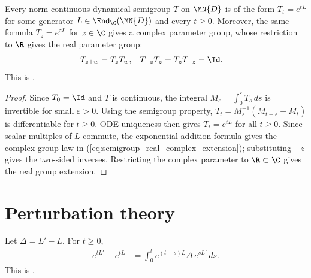 \begin{theorem}
    \label{thm:continuousDynSemigroup_eq_exp_ch12}
    \leanok
    Every norm-continuous dynamical semigroup $T$ on $\MN{D}$ is
    of the form $T_t = e^{tL}$ for some generator
    $L \in \End_{\C}(\MN{D})$ and every $t \ge 0$.
    Moreover, the same formula $T_z=e^{zL}$ for $z\in\C$ gives a complex
    parameter group, whose restriction to $\R$ gives the real parameter group:
    \begin{align}
        T_{z+w}&=T_zT_w,
        &T_{-z}T_z=T_zT_{-z}&=\Id.
        \label{eq:semigroup_real_complex_extension}
    \end{align}
    This is \cite[Proposition~7.1]{Wolf2012Quantum}.
\end{theorem}

\begin{proof}
    \leanok
    Since $T_0 = \Id$ and $T$ is continuous, the integral
    $M_\varepsilon = \int_0^\varepsilon T_s\,ds$ is invertible for small
    $\varepsilon > 0$.
    Using the semigroup property,
    $T_t = M_\varepsilon^{-1}(M_{t+\varepsilon} - M_t)$
    is differentiable for $t \ge 0$.
    ODE uniqueness then gives $T_t = e^{tL}$ for all $t \ge 0$.
    Since scalar multiples of $L$ commute, the exponential addition formula
    gives the complex group law in
    (\ref{eq:semigroup_real_complex_extension}); substituting $-z$
    gives the two-sided inverses. Restricting the complex parameter to
    $\R\subset\C$ gives the real group extension.
\end{proof}

\section{Perturbation theory}
\label{sec:perturbation}

\begin{theorem}\label{thm:duhamel_formula_ch12}
    \leanok
    Let $\Delta = L' - L$. For $t \ge 0$,
    \begin{align}
        e^{tL'} - e^{tL}
        &= \int_0^t e^{(t-s)L} \Delta\,e^{sL'}\,ds.
        \label{eq:semigroup_duhamel}
    \end{align}
    This is \cite[Lemma~7.1]{Wolf2012Quantum}.
\end{theorem}

